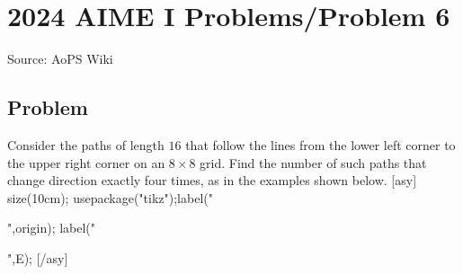 \documentclass[12pt]{article}
\begin{document}
\section*{{2024 AIME I Problems/Problem 6}}
Source: AoPS Wiki

\subsection*{Problem}
Consider the paths of length $16$ that follow the lines from the lower left corner to the upper right corner on an $8\times 8$ grid. Find the number of such paths that change direction exactly four times, as in the examples shown below. [asy] size(10cm); usepackage("tikz");label("",origin); label("",E); [/asy]
\end{document}
